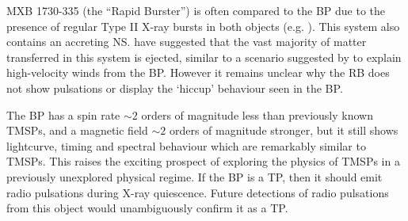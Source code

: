 \par MXB 1730-335 (the ``Rapid Burster'') is often compared to the BP due to the presence of regular Type II X-ray bursts in both objects (e.g. \citealp{Lewin_BP}).  This system also contains an accreting NS.  \citealp{Iaria_RB} have suggested that the vast majority of matter transferred in this system is ejected, similar to a scenario suggested by \citealp{Degenaar_BPSpec} to explain high-velocity winds from the BP.  However it remains unclear why the RB does not show pulsations or display the `hiccup' behaviour seen in the BP.

\par The BP has a spin rate $\sim2$ orders of magnitude less than previously known TMSPs, and a magnetic field $\sim2$ orders of magnitude stronger, but it still shows lightcurve, timing and spectral behaviour which are remarkably similar to TMSPs.  This raises the exciting prospect of exploring the physics of TMSPs in a previously unexplored physical regime.  If the BP is a TP, then it should emit radio pulsations during X-ray quiescence.  Future detections of radio pulsations from this object would unambiguously confirm it as a TP.


